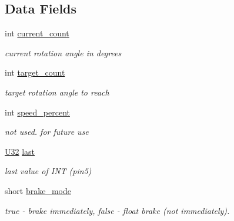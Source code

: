 \subsection*{Data Fields}
\begin{DoxyCompactItemize}
\item 
\hypertarget{structmotor__data__struct_a947ec255e0407f658f61a5e99a3a1a3f}{}int \hyperlink{structmotor__data__struct_a947ec255e0407f658f61a5e99a3a1a3f}{current\+\_\+count}\label{structmotor__data__struct_a947ec255e0407f658f61a5e99a3a1a3f}

\begin{DoxyCompactList}\small\item\em current rotation angle in degrees \end{DoxyCompactList}\item 
\hypertarget{structmotor__data__struct_a7eefe67ec3d87f4148c708dd3665efb2}{}int \hyperlink{structmotor__data__struct_a7eefe67ec3d87f4148c708dd3665efb2}{target\+\_\+count}\label{structmotor__data__struct_a7eefe67ec3d87f4148c708dd3665efb2}

\begin{DoxyCompactList}\small\item\em target rotation angle to reach \end{DoxyCompactList}\item 
\hypertarget{structmotor__data__struct_af6bb7532bdedf08e410879c022b273a8}{}int \hyperlink{structmotor__data__struct_af6bb7532bdedf08e410879c022b273a8}{speed\+\_\+percent}\label{structmotor__data__struct_af6bb7532bdedf08e410879c022b273a8}

\begin{DoxyCompactList}\small\item\em not used. for future use \end{DoxyCompactList}\item 
\hypertarget{structmotor__data__struct_a4b79ed65ee741709a1ba4ac4da565740}{}\hyperlink{mytypes_8h_a811024d35b9b8a41095b1f583b649e56}{U32} \hyperlink{structmotor__data__struct_a4b79ed65ee741709a1ba4ac4da565740}{last}\label{structmotor__data__struct_a4b79ed65ee741709a1ba4ac4da565740}

\begin{DoxyCompactList}\small\item\em last value of I\+N\+T (pin5) \end{DoxyCompactList}\item 
\hypertarget{structmotor__data__struct_a297efa77cb3b93d89e30c66e787330c3}{}short \hyperlink{structmotor__data__struct_a297efa77cb3b93d89e30c66e787330c3}{brake\+\_\+mode}\label{structmotor__data__struct_a297efa77cb3b93d89e30c66e787330c3}

\begin{DoxyCompactList}\small\item\em true -\/ brake immediately, false -\/ float brake (not immediately). \end{DoxyCompactList}\end{DoxyCompactItemize}


